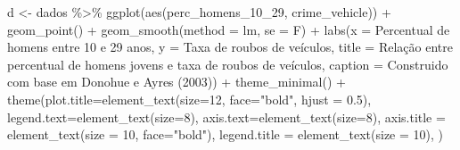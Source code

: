 \documentclass[
]{article}
\newenvironment{Shaded}{\begin{snugshade}}{\end{snugshade}}
\newcommand{\AttributeTok}[1]{\textcolor[rgb]{0.77,0.63,0.00}{#1}}
\newcommand{\DecValTok}[1]{\textcolor[rgb]{0.00,0.00,0.81}{#1}}
\newcommand{\FloatTok}[1]{\textcolor[rgb]{0.00,0.00,0.81}{#1}}
\newcommand{\FunctionTok}[1]{\textcolor[rgb]{0.00,0.00,0.00}{#1}}
\newcommand{\NormalTok}[1]{#1}
\newcommand{\OtherTok}[1]{\textcolor[rgb]{0.56,0.35,0.01}{#1}}
\newcommand{\SpecialCharTok}[1]{\textcolor[rgb]{0.00,0.00,0.00}{#1}}
\newcommand{\StringTok}[1]{\textcolor[rgb]{0.31,0.60,0.02}{#1}}
\begin{document}
\begin{Shaded}
\begin{Highlighting}[]
\NormalTok{d }\OtherTok{\textless{}{-}}\NormalTok{ dados }\SpecialCharTok{\%\textgreater{}\%} 
  \FunctionTok{ggplot}\NormalTok{(}\FunctionTok{aes}\NormalTok{(perc\_homens\_10\_29, crime\_vehicle)) }\SpecialCharTok{+}
  \FunctionTok{geom\_point}\NormalTok{() }\SpecialCharTok{+} 
  \FunctionTok{geom\_smooth}\NormalTok{(}\AttributeTok{method =} \StringTok{\textquotesingle{}lm\textquotesingle{}}\NormalTok{, }\AttributeTok{se =}\NormalTok{ F) }\SpecialCharTok{+}
  \FunctionTok{labs}\NormalTok{(}\AttributeTok{x =} \StringTok{\textquotesingle{}Percentual de homens entre 10 e 29 anos\textquotesingle{}}\NormalTok{,}
       \AttributeTok{y =} \StringTok{\textquotesingle{}Taxa de roubos de veículos\textquotesingle{}}\NormalTok{,}
       \AttributeTok{title =} \StringTok{\textquotesingle{}Relação entre percentual de homens jovens e taxa de roubos de veículos\textquotesingle{}}\NormalTok{,}
       \AttributeTok{caption =} \StringTok{\textquotesingle{}Construido com base em Donohue e Ayres (2003)\textquotesingle{}}\NormalTok{) }\SpecialCharTok{+} 
  \FunctionTok{theme\_minimal}\NormalTok{() }\SpecialCharTok{+}
  \FunctionTok{theme}\NormalTok{(}\AttributeTok{plot.title=}\FunctionTok{element\_text}\NormalTok{(}\AttributeTok{size=}\DecValTok{12}\NormalTok{, }\AttributeTok{face=}\StringTok{"bold"}\NormalTok{, }\AttributeTok{hjust =} \FloatTok{0.5}\NormalTok{),}
        \AttributeTok{legend.text=}\FunctionTok{element\_text}\NormalTok{(}\AttributeTok{size=}\DecValTok{8}\NormalTok{),}
        \AttributeTok{axis.text=}\FunctionTok{element\_text}\NormalTok{(}\AttributeTok{size=}\DecValTok{8}\NormalTok{),}
        \AttributeTok{axis.title =} \FunctionTok{element\_text}\NormalTok{(}\AttributeTok{size =} \DecValTok{10}\NormalTok{, }\AttributeTok{face=}\StringTok{"bold"}\NormalTok{),}
        \AttributeTok{legend.title =} \FunctionTok{element\_text}\NormalTok{(}\AttributeTok{size =} \DecValTok{10}\NormalTok{),}
\NormalTok{        )}
  

\end{Highlighting}
\end{Shaded}
\end{document}

